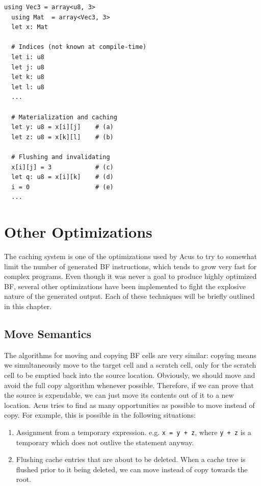 \vspace{0.5cm}\noindent\begin{minipage}{\textwidth}
\begin{lstlisting}[style=pseudocode]
  using Vec3 = array<u8, 3>
  using Mat  = array<Vec3, 3>
  let x: Mat

  # Indices (not known at compile-time)
  let i: u8
  let j: u8
  let k: u8
  let l: u8
  ...

  # Materialization and caching
  let y: u8 = x[i][j]    # (a)
  let z: u8 = x[k][l]    # (b)

  # Flushing and invalidating
  x[i][j] = 3            # (c)
  let q: u8 = x[i][k]    # (d)
  i = 0                  # (e)
  ...
\end{lstlisting}
\end{minipage}

\chapter{Other Optimizations}
The caching system is one of the optimizations used by Acus to try to somewhat limit the number of generated BF instructions, which tends to grow very fast for complex programs. Even though it was never a goal to produce highly optimized BF, several other optimizations have been implemented to fight the explosive nature of the generated output. Each of these techniques will be briefly outlined in this chapter.

\section{Move Semantics}
The algorithms for moving and copying BF cells are very similar: copying means we simultaneously move to the target cell and a scratch cell, only for the scratch cell to be emptied back into the source location. Obviously, we should move and avoid the full copy algorithm whenever possible. Therefore, if we can prove that the source is expendable, we can just move its contents out of it to a new location. Acus tries to find as many opportunities as possible to move instead of copy. For example, this is possible in the following situations:
\begin{enumerate}\itemsep0em
\item Assignment from a temporary expression. e.g. \texttt{x = y + z}, where \texttt{y + z} is a temporary which does not outlive the statement anyway. 
\item Flushing cache entries that are about to be deleted. When a cache tree is flushed prior to it being deleted, we can move instead of copy towards the root.
\end{enumerate}


